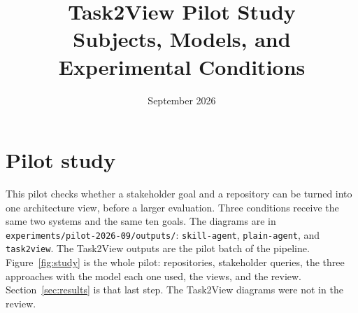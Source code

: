 \documentclass[11pt]{article}
\title{Task2View Pilot Study\\
Subjects, Models, and Experimental Conditions}
\author{}
\date{September 2026}
\begin{document}
\maketitle

\section{Pilot study}
This pilot checks whether a stakeholder goal and a repository can be turned into one architecture view, before a larger evaluation. Three conditions receive the same two systems and the same ten goals. The diagrams are in \texttt{experiments/pilot-2026-09/outputs/}: \texttt{skill-agent}, \texttt{plain-agent}, and \texttt{task2view}. The Task2View outputs are the pilot batch of the pipeline. Figure~\ref{fig:study} is the whole pilot: repositories, stakeholder queries, the three approaches with the model each one used, the views, and the review. Section~\ref{sec:results} is that last step. The Task2View diagrams were not in the review.
\end{document}
